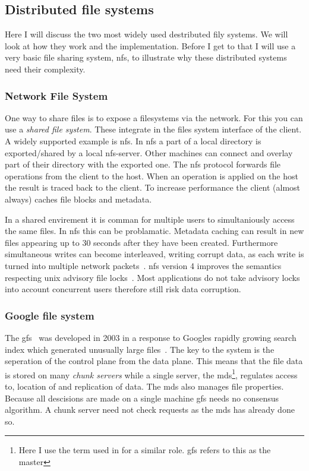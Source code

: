 \subsection{Distributed file systems}
Here I will discuss the two most widely used destributed fily systems. We will look at how they work and the implementation. Before I get to that I will use a very basic file sharing system, \ac{nfs}, to illustrate why these distributed systems need their complexity.

\subsubsection*{Network File System}
One way to share files is to expose a filesystems via the network. For this you can use a \textit{shared file system}. These integrate in the files system interface of the client. A widely supported example is \acf{nfs}. In \ac{nfs} a part of a local directory is exported/shared by a local \ac{nfs}-server. Other machines can connect and overlay part of their directory with the exported one. The \ac{nfs} protocol forwards file operations from the client to the host. When an operation is applied on the host the result is traced back to the client. To increase performance the client (almost always) caches file blocks and metadata. 

In a shared envirement it is comman for multiple users to simultaniously access the same files. In \ac{nfs} this can be problamatic. Metadata caching can result in new files appearing up to 30 seconds after they have been created. Furthermore simultaneous writes can become interleaved, writing corrupt data, as each write is turned into multiple network packets~\cite[p. 527]{os}. \ac{nfs} version 4 improves the semantics respecting unix advisory file locks~\cite{rfc3530}. Most applications do not take advisory locks into account concurrent users therefore still risk data corruption. 

\subsubsection*{Google file system}
The \ac{gfs}~\cite{GFS} was developed in 2003 in a response to Googles rapidly growing search index which generated unusually large files~\cite{GFS_interview}. The key to the system is the seperation of the control plane from the data plane. This means that the file data is stored on many \textit{chunk servers} while a single server, the \ac{mds}\footnote{Here I use the term used in \ceph{} for a similar role. \ac{gfs} refers to this as the master}, regulates access to, location of and replication of data. The \ac{mds} also manages file properties. Because all descisions are made on a single machine \ac{gfs} needs no consensus algorithm. A chunk server need not check requests as the \ac{mds} has already done so. 

